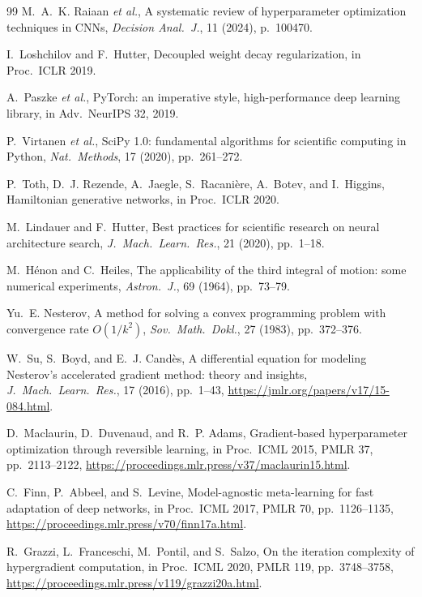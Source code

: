 \documentclass[11pt]{article}
\theoremstyle{definition}
\begin{document}
\begin{thebibliography}{99}
M.~A.~K. Raiaan \textit{et al.},
A systematic review of hyperparameter optimization techniques in CNNs,
\textit{Decision Anal.\ J.}, 11 (2024), p.~100470.

I.~Loshchilov and F.~Hutter,
Decoupled weight decay regularization,
in Proc.\ ICLR 2019.

A.~Paszke \textit{et al.},
PyTorch: an imperative style, high-performance deep learning library,
in Adv.\ NeurIPS 32, 2019.

P.~Virtanen \textit{et al.},
SciPy 1.0: fundamental algorithms for scientific computing in Python,
\textit{Nat.\ Methods}, 17 (2020), pp.~261--272.

P.~Toth, D.~J. Rezende, A.~Jaegle, S.~Racani\`{e}re, A.~Botev,
and I.~Higgins,
Hamiltonian generative networks,
in Proc.\ ICLR 2020.

M.~Lindauer and F.~Hutter,
Best practices for scientific research on neural architecture search,
\textit{J.\ Mach.\ Learn.\ Res.}, 21 (2020), pp.~1--18.

M.~H\'{e}non and C.~Heiles,
The applicability of the third integral of motion: some numerical
experiments,
\textit{Astron.\ J.}, 69 (1964), pp.~73--79.

Yu.~E. Nesterov,
A method for solving a convex programming problem with convergence rate
$O(1/k^2)$,
\textit{Sov.\ Math.\ Dokl.}, 27 (1983), pp.~372--376.

W.~Su, S.~Boyd, and E.~J. Cand\`{e}s,
A differential equation for modeling Nesterov's accelerated gradient method:
theory and insights,
\textit{J.\ Mach.\ Learn.\ Res.}, 17 (2016), pp.~1--43,
\url{https://jmlr.org/papers/v17/15-084.html}.

D.~Maclaurin, D.~Duvenaud, and R.~P. Adams,
Gradient-based hyperparameter optimization through reversible learning,
in Proc.\ ICML 2015, PMLR 37, pp.~2113--2122,
\url{https://proceedings.mlr.press/v37/maclaurin15.html}.

C.~Finn, P.~Abbeel, and S.~Levine,
Model-agnostic meta-learning for fast adaptation of deep networks,
in Proc.\ ICML 2017, PMLR 70, pp.~1126--1135,
\url{https://proceedings.mlr.press/v70/finn17a.html}.

R.~Grazzi, L.~Franceschi, M.~Pontil, and S.~Salzo,
On the iteration complexity of hypergradient computation,
in Proc.\ ICML 2020, PMLR 119, pp.~3748--3758,
\url{https://proceedings.mlr.press/v119/grazzi20a.html}.


\end{thebibliography}
\end{document}

